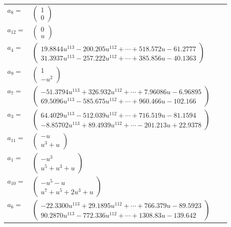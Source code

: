 \documentclass[1p]{elsarticle_modified}
\theoremstyle{definition}
\begin{document}
\begin{tabular}{m{7pt} m{180pt} m{7pt} m{180pt} }
\flushright $a_{8}=$&$\begin{pmatrix}1\\0\end{pmatrix}$ \\
\flushright $a_{12}=$&$\begin{pmatrix}0\\u\end{pmatrix}$ \\
\flushright $a_{4}=$&$\begin{pmatrix}19.8844 u^{113}-200.205 u^{112}+\cdots+518.572 u-61.2777\\31.3937 u^{113}-257.222 u^{112}+\cdots+385.856 u-40.1363\end{pmatrix}$ \\
\flushright $a_{9}=$&$\begin{pmatrix}1\\- u^2\end{pmatrix}$ \\
\flushright $a_{7}=$&$\begin{pmatrix}-51.3794 u^{113}+326.932 u^{112}+\cdots+7.96086 u-6.96895\\69.5096 u^{113}-585.675 u^{112}+\cdots+960.466 u-102.166\end{pmatrix}$ \\
\flushright $a_{3}=$&$\begin{pmatrix}64.4029 u^{113}-512.039 u^{112}+\cdots+716.519 u-81.1594\\-8.85702 u^{113}+89.4939 u^{112}+\cdots-201.213 u+22.9378\end{pmatrix}$ \\
\flushright $a_{11}=$&$\begin{pmatrix}- u\\u^3+u\end{pmatrix}$ \\
\flushright $a_{1}=$&$\begin{pmatrix}- u^3\\u^5+u^3+u\end{pmatrix}$ \\
\flushright $a_{10}=$&$\begin{pmatrix}- u^5- u\\u^7+u^5+2 u^3+u\end{pmatrix}$ \\
\flushright $a_{6}=$&$\begin{pmatrix}-22.3300 u^{113}+29.1895 u^{112}+\cdots+766.379 u-89.5923\\90.2870 u^{113}-772.336 u^{112}+\cdots+1308.83 u-139.642\end{pmatrix}$ \\

\end{tabular}
\end{document}
